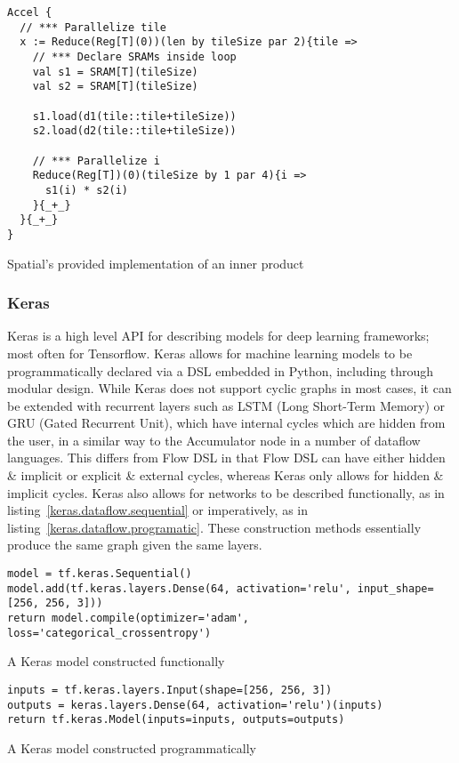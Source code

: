 \renewcommand\theFancyVerbLine{\arabic{FancyVerbLine}}
\begin{listing}[H]
  \begin{verbatim}
Accel {
  // *** Parallelize tile
  x := Reduce(Reg[T](0))(len by tileSize par 2){tile =>
    // *** Declare SRAMs inside loop
    val s1 = SRAM[T](tileSize)
    val s2 = SRAM[T](tileSize)
    
    s1.load(d1(tile::tile+tileSize))
    s2.load(d2(tile::tile+tileSize))
    
    // *** Parallelize i
    Reduce(Reg[T])(0)(tileSize by 1 par 4){i => 
      s1(i) * s2(i)
    }{_+_}
  }{_+_}
}
\end{verbatim}
  \caption{Spatial's provided implementation of an inner product}\label{spatial.innerproduct}
\end{listing}

\subsubsection{Keras}
Keras is a high level API for describing models for deep learning frameworks; most often for Tensorflow. Keras allows for machine learning models to be programmatically declared via a DSL embedded in Python, including through modular design. While Keras does not support cyclic graphs in most cases, it can be extended with recurrent layers such as LSTM (Long Short-Term Memory) or GRU (Gated Recurrent Unit), which have internal cycles which are hidden from the user, in a similar way to the Accumulator node in a number of dataflow languages. This differs from Flow DSL in that Flow DSL can have either hidden \& implicit or explicit \& external cycles, whereas Keras only allows for hidden \& implicit cycles. Keras also allows for networks to be described functionally, as in listing \ref{keras.dataflow.sequential} or imperatively, as in listing \ref{keras.dataflow.programatic}. These construction methods essentially produce the same graph given the same layers.

\renewcommand\theFancyVerbLine{\arabic{FancyVerbLine}}
\begin{listing}[H]
  \begin{verbatim}
model = tf.keras.Sequential()
model.add(tf.keras.layers.Dense(64, activation='relu', input_shape=[256, 256, 3]))
return model.compile(optimizer='adam', loss='categorical_crossentropy')
  \end{verbatim}
  \caption{A Keras model constructed functionally}\label{keras.dataflow.sequential}
\end{listing}

\renewcommand\theFancyVerbLine{\arabic{FancyVerbLine}}
\begin{listing}[H]
  \begin{verbatim}
inputs = tf.keras.layers.Input(shape=[256, 256, 3])
outputs = keras.layers.Dense(64, activation='relu')(inputs)
return tf.keras.Model(inputs=inputs, outputs=outputs)
  \end{verbatim}
  \caption{A Keras model constructed programmatically}\label{keras.dataflow.programatic}
\end{listing}